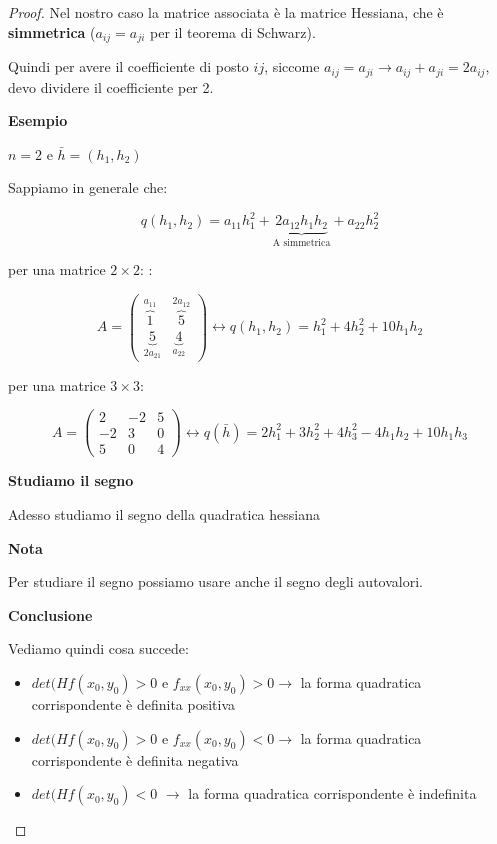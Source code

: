 \documentclass[../appunti-analisi.tex]{subfiles}
\begin{document}
\begin{proof}
       Nel nostro caso la matrice associata è la matrice Hessiana, che è \textbf{simmetrica} ($a_{ij} = a_{ji}$ per il teorema di Schwarz).

       Quindi per avere il coefficiente di posto $ij$, siccome $a_{ij} = a_{ji} \rightarrow a_{ij} + a_{ji} = 2a_{ij}$, devo dividere il coefficiente per 2.


\textbf{Esempio} 

$n=2$ e $\bar{h} =(h_1,h_2)$

Sappiamo in generale che:

\[
    q(h_1,h_2) = a_{11} h_1^{2} + \underbrace{2a_{12} h_1 h_2}_\text{A simmetrica} + a_{22}h_2^{2}
\]

per una matrice $2\times 2$:
:

\[
    A= \begin{pmatrix}
        \overbrace{1}^\text{$a_{11}$} & \overbrace{5}^\text{$2a_{12}$}\\
        \underbrace{5}_\text{$2a_{21}$} & \underbrace{4}_\text{$a_{22}$}
    \end{pmatrix} \leftrightarrow 
    q(h_1,h_2) = h_1^{2}+4 h_2^{2}+ 10 h_1 h_2
\]

per una matrice $3\times 3$:

\[
    A = \begin{pmatrix}
    2 & -2 & 5\\
    -2 & 3 & 0\\
    5 & 0 & 4
    \end{pmatrix} \leftrightarrow
    q(\bar{h} ) = 2 h_1^{2}+3 h_2^{2}+ 4 h_3^{2} - 4 h_1 h_2 + 10 h_1 h_3
\]

\newpage

\textbf{Studiamo il segno} 

Adesso studiamo il segno della quadratica hessiana




\textbf{Nota} 

Per studiare il segno possiamo usare anche il segno degli autovalori.

\textbf{Conclusione} 

Vediamo quindi cosa succede:

\begin{itemize}
    \item $det(Hf(x_0,y_0)>0$ e $f_{xx}(x_0,y_0)>0 \rightarrow $ la forma quadratica corrispondente è definita positiva
    \item $det(Hf(x_0,y_0)>0$ e $f_{xx}(x_0,y_0)<0 \rightarrow $ la forma quadratica corrispondente è definita negativa
    \item $det(Hf(x_0,y_0)<0$ $\rightarrow $ la forma quadratica corrispondente è indefinita
\end{itemize}

\end{proof}
 
\end{document}
